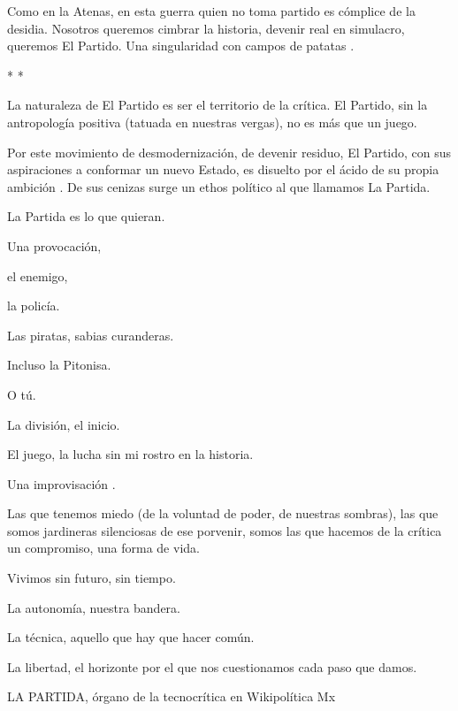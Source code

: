 Como en la Atenas, en esta guerra quien no toma partido es cómplice de
la desidia. Nosotros queremos cimbrar la historia, devenir real en
simulacro, queremos El Partido. Una singularidad con campos de
patatas \cite{Wikipedia2023a}.

\begin{center}
    * *
\end{center}

La naturaleza de El Partido es ser el territorio de la crítica. El
Partido, sin la antropología positiva (tatuada en nuestras vergas), no
es más que un juego.

Por este movimiento de desmodernización, de devenir residuo, El Partido,
con sus aspiraciones a conformar un nuevo Estado, es disuelto por el
ácido de su propia ambición \cite{Tiqqun2013a}. De sus
cenizas surge un ethos político al que llamamos La Partida.

La Partida es lo que quieran.

Una provocación,

el enemigo,

la policía.

Las piratas, sabias curanderas.

Incluso la Pitonisa.

O tú.

La división, el inicio.

El juego, la lucha sin mi rostro en la historia.

Una improvisación \cite{Icle2009}.

Las que tenemos miedo (de la voluntad de poder, de nuestras sombras),
las que somos jardineras silenciosas de ese porvenir, somos las que
hacemos de la crítica un compromiso, una forma de vida.

Vivimos sin futuro, sin tiempo.

La autonomía, nuestra bandera.

La técnica, aquello que hay que hacer común.

La libertad, el horizonte por el que nos cuestionamos cada paso que
damos.

LA PARTIDA, órgano de la tecnocrítica en Wikipolítica Mx
